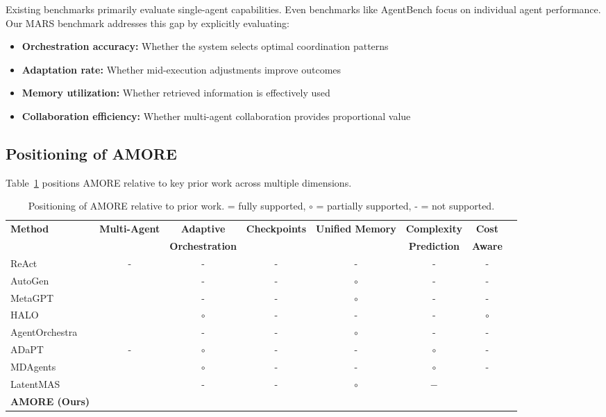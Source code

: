 \documentclass{article}
\theoremstyle{plain}
\theoremstyle{definition}
\theoremstyle{remark}
\begin{document}
Existing benchmarks primarily evaluate single-agent capabilities. Even benchmarks like AgentBench focus on individual agent performance. Our MARS benchmark addresses this gap by explicitly evaluating:
\begin{itemize}
	\item \textbf{Orchestration accuracy:} Whether the system selects optimal coordination patterns
	\item \textbf{Adaptation rate:} Whether mid-execution adjustments improve outcomes
	\item \textbf{Memory utilization:} Whether retrieved information is effectively used
	\item \textbf{Collaboration efficiency:} Whether multi-agent collaboration provides proportional value
\end{itemize}

\subsection{Positioning of AMORE}
\label{sec:positioning}

Table~\ref{tab:positioning} positions AMORE relative to key prior work across multiple dimensions.

\begin{table}[t]
	\centering
	\caption{Positioning of AMORE relative to prior work. \checkmark = fully supported, $\circ$ = partially supported, - = not supported.}
	\label{tab:positioning}
	\small
	\begin{tabular}{@{}lccccccc@{}}
		\toprule
		\textbf{Method} & \textbf{Multi-Agent} & \textbf{Adaptive} & \textbf{Checkpoints} & \textbf{Unified Memory} & \textbf{Complexity} & \textbf{Cost} \\
		& & \textbf{Orchestration} & & & \textbf{Prediction} & \textbf{Aware} \\
		\midrule
		ReAct \citep{yao2023react} & - & - & - & - & - & - \\
		AutoGen \citep{wu2023autogen} & \checkmark & - & - & $\circ$ & - & - \\
		MetaGPT \citep{hong2024metagpt} & \checkmark & - & - & $\circ$ & - & - \\
		HALO \citep{chen2025halo} & \checkmark & $\circ$ & - & - & - & $\circ$ \\
		AgentOrchestra \citep{liu2025agentorchestra} & \checkmark & - & - & $\circ$ & - & - \\
		ADaPT \citep{prasad2024adapt} & - & $\circ$ & - & - & $\circ$ & - \\
		MDAgents \citep{kim2024mdagents} & \checkmark & $\circ$ & - & - & $\circ$ & - \\
		LatentMAS \citep{zou2025latent} & \checkmark & - & - & $\circ$ & $-$ & \checkmark \\
		\midrule
		\textbf{AMORE (Ours)} & \checkmark & \checkmark & \checkmark & \checkmark & \checkmark & \checkmark \\
		\bottomrule
	\end{tabular}
\end{table}
\end{document}
